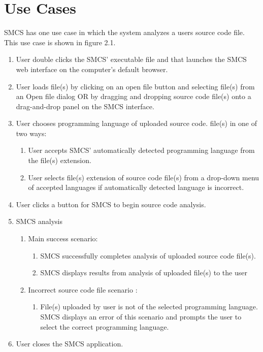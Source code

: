 \documentclass{scrreprt}
\begin{document}
	\section{Use Cases}
	SMCS has one use case in which the system analyzes a users source code file. This use case is shown in figure 2.1.
	\pagestyle{plain}
	\begin{enumerate}
		\item User double clicks the SMCS’ executable file and that launches the SMCS web interface on the computer’s default browser.
		\item User loads file(s) by clicking on an open file button and selecting file(s) from an Open file dialog OR by dragging and dropping source code file(s) onto a drag-and-drop panel on the SMCS interface.
		\item User chooses programming language of uploaded source code. file(s) in one of two ways:
		\begin{enumerate}
			\item User accepts SMCS’ automatically detected programming language from the file(s) extension.
			\item User selects file(s) extension of source code file(s) from a drop-down menu of accepted languages if automatically detected language is incorrect.
		\end{enumerate}
		\item User clicks a button for SMCS to begin source code analysis.
		\item SMCS analysis
		\begin{enumerate}
			\item Main success scenario:
			\begin{enumerate}
				\item SMCS successfully completes analysis of uploaded source code file(s).
				\item SMCS displays results from analysis of uploaded file(s) to the user
			\end{enumerate}
			\item Incorrect source code file scenario :
			\begin{enumerate}
				\item File(s) uploaded by user is not of the selected programming language. SMCS displays an error of this scenario and prompts the user to select the correct programming language.
			\end{enumerate}
		\end{enumerate}
		\item User closes the SMCS application.
	\end{enumerate}
\end{document}
